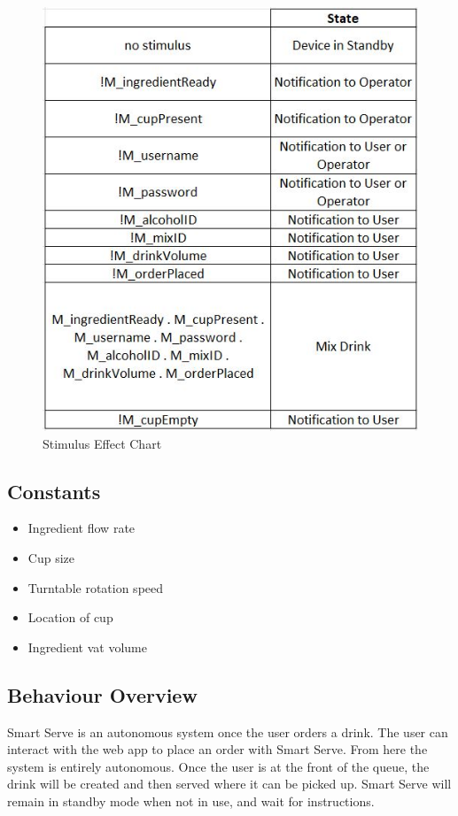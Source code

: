 \documentclass{article}
\begin{document}
    \begin{figure}[H]
    \centerline{\includegraphics[scale=1.1]{StimulusEffect.JPG}}
    \caption{Stimulus Effect Chart}
    \label{fig}
    \end{figure}

\subsection{Constants}
    \begin{itemize}
        \item Ingredient flow rate
        \item Cup size
        \item Turntable rotation speed
        \item Location of cup
        \item Ingredient vat volume
    \end{itemize}

\subsection{Behaviour Overview}
    Smart Serve is an autonomous system once the user orders a drink. The user can interact with the web app to place an order with Smart Serve. From here the system is entirely autonomous. Once the user is at the front of the queue, the drink will be created and then served where it can be picked up. Smart Serve will remain in standby mode when not in use, and wait for instructions.
\end{document}
